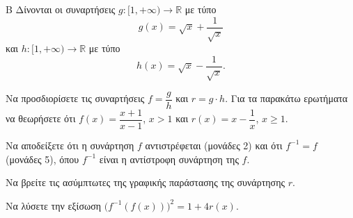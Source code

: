 \begin{thema}{Β}
Δίνονται οι συναρτήσεις $g: [1, +\infty) \to \mathbb{R}$ με τύπο
\[
g(x) = \sqrt{x} + \frac{1}{\sqrt{x}}
\]
και $h: [1, +\infty) \to \mathbb{R}$ με τύπο
\[
h(x) = \sqrt{x} - \frac{1}{\sqrt{x}}.
\]
\begin{erwthma}
    \item Να προσδιορίσετε τις συναρτήσεις $f = \dfrac{g}{h}$ και $r = g \cdot h$. 
Για τα παρακάτω ερωτήματα να θεωρήσετε ότι $f(x) = \dfrac{x+1}{x-1}$, $x > 1$ και $r(x) = x - \dfrac{1}{x}$, $x \geq 1$.

    \item Να αποδείξετε ότι η συνάρτηση $f$ αντιστρέφεται (μονάδες 2) και ότι $f^{-1} = f$ (μονάδες 5), όπου $f^{-1}$ είναι η αντίστροφη συνάρτηση της $f$. 

    \item Να βρείτε τις ασύμπτωτες της γραφικής παράστασης της συνάρτησης $r$. 

    \item Να λύσετε την εξίσωση $\bigl(f^{-1}(f(x))\bigr)^2 = 1 + 4r(x)$. 
\end{erwthma}
\end{thema}

